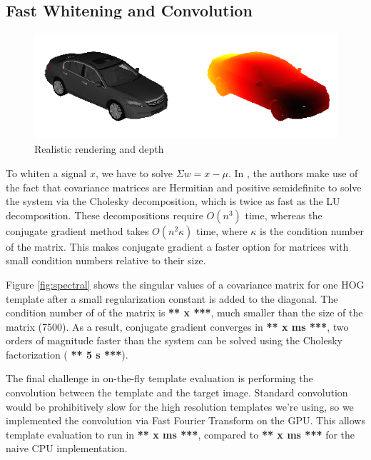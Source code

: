 \documentclass[10pt,twocolumn,letterpaper]{article}
\newcommand{\scream}[1]{{\color{red} \bf *** #1 ***}}
\begin{document}
\subsection{Fast Whitening and Convolution}
\label{sec:fast_whitening}
\begin{figure}[t]
  \begin{center}
     \includegraphics[width=0.9\linewidth]{whiten_orig_depth} 
  \end{center}
  \caption{Realistic rendering and depth}
  \label{fig:rendering}
  \end{figure}
 
To whiten a signal $x$, we have to solve $\Sigma w = x - \mu$. In \cite{Hariharan12}, the authors make use of the fact that covariance matrices are Hermitian and positive semidefinite to solve the system via the Cholesky decomposition, which is twice as fast as the LU decomposition. These decompositions require $O(n^3)$ time, whereas the conjugate gradient method takes $O(n^2\kappa)$ time, where $\kappa$ is the condition number of the matrix. This makes conjugate gradient a faster option for matrices with small condition numbers relative to their size.

Figure \ref{fig:spectral} shows the singular values of a covariance matrix for one HOG template after a small regularization constant is added to the diagonal. The condition number of of the matrix is \scream{x}, much smaller than the size of the matrix (7500). As a result, conjugate gradient converges in \scream{x ms}, two orders of magnitude faster than the system can be solved using the Cholesky factorization (\scream{5 s}).

The final challenge in on-the-fly template evaluation is performing the convolution between the template and the target image. Standard convolution would be prohibitively slow for the high resolution templates we're using, so we implemented the convolution via Fast Fourier Transform on the GPU. This allows template evaluation to run in \scream{x ms}, compared to \scream{x ms} for the naive CPU implementation.

  
\end{document}
